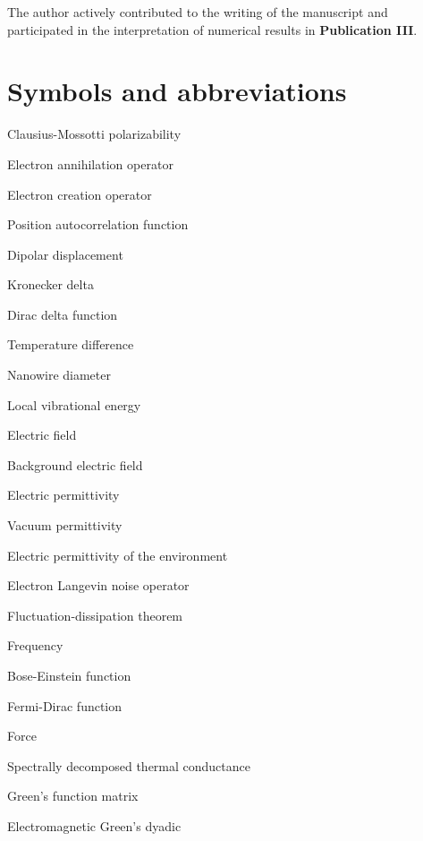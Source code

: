 \documentclass[dissertation,draft*]{aaltoseries}
\newcommand{\listofsymbols}{%
  \chapter*{Symbols and abbreviations}%
}
\begin{document}
\vspace{1cm}
\noindent
The author actively contributed to the writing of the manuscript and participated in the interpretation of numerical results in \textbf{Publication III}.

\listofsymbols
{}

\begin{description} \itemsep2pt
  \item[$\alpha^{\textrm{CM}}$] Clausius-Mossotti polarizability
  \item[$c$] Electron annihilation operator 
  \item[$c^{\dagger}$] Electron creation operator 
  \item[$C$] Position autocorrelation function
  \item[$d$] Dipolar displacement 
  \item[$\delta_{ij}$] Kronecker delta
   \item[$\delta(x-x')$] Dirac delta function
  \item[$\Delta T$] Temperature difference
  \item[$D$] Nanowire diameter
    \item[$e$] Local vibrational energy
   \item[$E$] Electric field  
   \item[$E_{\textrm{env}}$] Background electric field
   \item[$\varepsilon$] Electric permittivity
   \item[$\varepsilon_0$] Vacuum permittivity
   \item[$\varepsilon_{\textrm{env}}$] Electric permittivity of the environment
   \item[$\eta$] Electron Langevin noise operator
   \item[FDT] Fluctuation-dissipation theorem
   \item[$f$] Frequency
   \item[$f_{\textrm{BE}}$] Bose-Einstein function
   \item[$f_{\textrm{FD}}$] Fermi-Dirac function
  \item[$F$] Force
  \item[$g$] Spectrally decomposed thermal conductance
  \item[$G$] Green's function matrix
  \item[$\mathbb{G}$] Electromagnetic Green's dyadic

\end{description}
\end{document}
